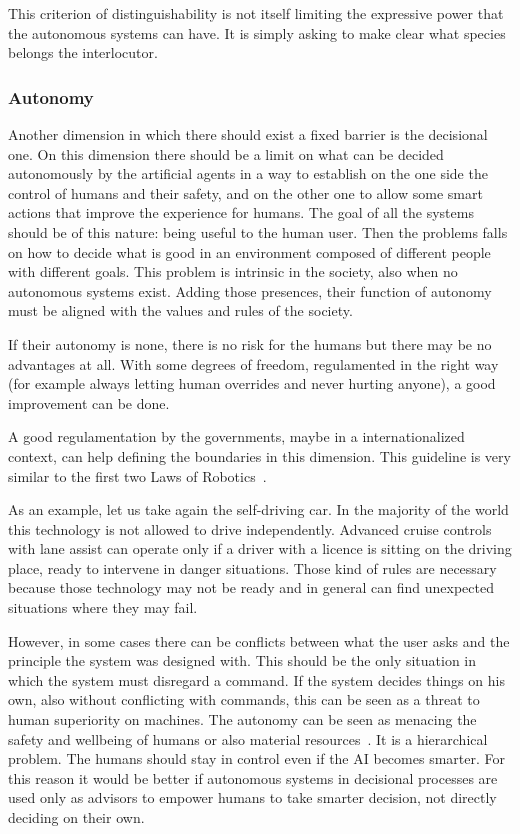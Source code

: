 This criterion of distinguishability is not itself limiting the expressive power that the autonomous systems can have. It is simply asking to make clear what species belongs the interlocutor.

\subsubsection{Autonomy}
Another dimension in which there should exist a fixed barrier is the decisional one. On this dimension there should be a limit on what can be decided autonomously by the artificial agents in a way to establish on the one side the control of humans and their safety, and on the other one to allow some smart actions that improve the experience for humans. The goal of all the systems should be of this nature: being useful to the human user. Then the problems falls on how to decide what is good in an environment composed of different people with different goals. This problem is intrinsic in the society, also when no autonomous systems exist. Adding those presences, their function of autonomy must be aligned with the values and rules of the society.

If their autonomy is none, there is no risk for the humans but there may be no advantages at all. With some degrees of freedom, regulamented in the right way (for example always letting human overrides and never hurting anyone), a good improvement can be done.

A good regulamentation by the governments, maybe in a internationalized context, can help defining the boundaries in this dimension. This guideline is very similar to the first two Laws of Robotics~\cite{asimov1942runaround}.

As an example, let us take again the self-driving car. In the majority of the world this technology is not allowed to drive independently. Advanced cruise controls with lane assist can operate only if a driver with a licence is sitting on the driving place, ready to intervene in danger situations. Those kind of rules are necessary because those technology may not be ready and in general can find unexpected situations where they may fail.

However, in some cases there can be conflicts between what the user asks and the principle the system was designed with. This should be the only situation in which the system must disregard a command. If the system decides things on his own, also without conflicting with commands, this can be seen as a threat to human superiority on machines. The autonomy can be seen as menacing the safety and wellbeing of humans or also material resources~\cite{zlotowski2017can}. It is a hierarchical problem. The humans should stay in control even if the AI becomes smarter. For this reason it would be better if autonomous systems in decisional processes are used only as advisors to empower humans to take smarter decision, not directly deciding on their own.


